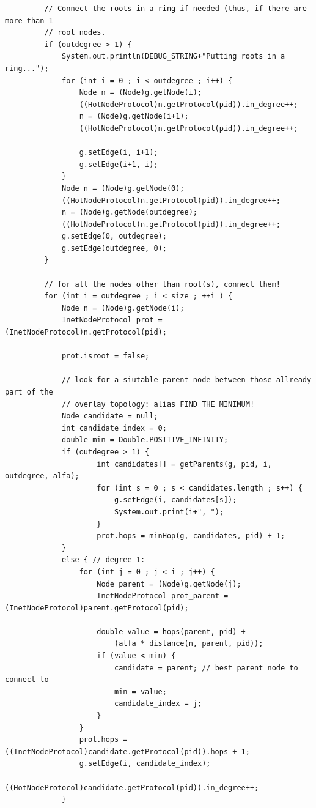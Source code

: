 \documentclass[a4paper,12pt]{article}
\begin{document}
\begin{verbatim}
         // Connect the roots in a ring if needed (thus, if there are more than 1
         // root nodes.
         if (outdegree > 1) {
             System.out.println(DEBUG_STRING+"Putting roots in a ring...");
             for (int i = 0 ; i < outdegree ; i++) {
                 Node n = (Node)g.getNode(i);
                 ((HotNodeProtocol)n.getProtocol(pid)).in_degree++;
                 n = (Node)g.getNode(i+1);
                 ((HotNodeProtocol)n.getProtocol(pid)).in_degree++;
                 
                 g.setEdge(i, i+1);
                 g.setEdge(i+1, i);
             }
             Node n = (Node)g.getNode(0);
             ((HotNodeProtocol)n.getProtocol(pid)).in_degree++;
             n = (Node)g.getNode(outdegree);
             ((HotNodeProtocol)n.getProtocol(pid)).in_degree++;
             g.setEdge(0, outdegree);
             g.setEdge(outdegree, 0);
         }
         
         // for all the nodes other than root(s), connect them!
         for (int i = outdegree ; i < size ; ++i ) {
             Node n = (Node)g.getNode(i);
             InetNodeProtocol prot = (InetNodeProtocol)n.getProtocol(pid);
             
             prot.isroot = false;
             
             // look for a siutable parent node between those allready part of the
             // overlay topology: alias FIND THE MINIMUM!
             Node candidate = null;
             int candidate_index = 0;
             double min = Double.POSITIVE_INFINITY;
             if (outdegree > 1) {
                     int candidates[] = getParents(g, pid, i, outdegree, alfa);
                     for (int s = 0 ; s < candidates.length ; s++) {
                         g.setEdge(i, candidates[s]);
                         System.out.print(i+", ");
                     }
                     prot.hops = minHop(g, candidates, pid) + 1;
             }
             else { // degree 1:
                 for (int j = 0 ; j < i ; j++) {
                     Node parent = (Node)g.getNode(j);
                     InetNodeProtocol prot_parent = (InetNodeProtocol)parent.getProtocol(pid);
                           
                     double value = hops(parent, pid) + 
                         (alfa * distance(n, parent, pid));
                     if (value < min) {
                         candidate = parent; // best parent node to connect to
                         min = value;
                         candidate_index = j;
                     }   
                 }
                 prot.hops = ((InetNodeProtocol)candidate.getProtocol(pid)).hops + 1; 
                 g.setEdge(i, candidate_index);
                 ((HotNodeProtocol)candidate.getProtocol(pid)).in_degree++;
             }
             

\end{verbatim}
\end{document}
